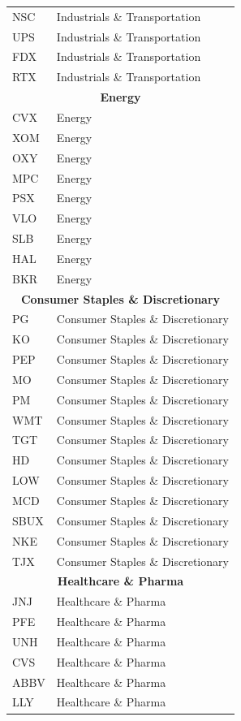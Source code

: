 \begin{longtable}{ll}
NSC & Industrials \& Transportation \\
UPS & Industrials \& Transportation \\
FDX & Industrials \& Transportation \\
RTX & Industrials \& Transportation \\
\multicolumn{2}{c}{\textbf{Energy}} \\
CVX & Energy \\
XOM & Energy \\
OXY & Energy \\
MPC & Energy \\
PSX & Energy \\
VLO & Energy \\
SLB & Energy \\
HAL & Energy \\
BKR & Energy \\
\multicolumn{2}{c}{\textbf{Consumer Staples \& Discretionary}} \\
PG   & Consumer Staples \& Discretionary \\
KO   & Consumer Staples \& Discretionary \\
PEP  & Consumer Staples \& Discretionary \\
MO   & Consumer Staples \& Discretionary \\
PM   & Consumer Staples \& Discretionary \\
WMT  & Consumer Staples \& Discretionary \\
TGT  & Consumer Staples \& Discretionary \\
HD   & Consumer Staples \& Discretionary \\
LOW  & Consumer Staples \& Discretionary \\
MCD  & Consumer Staples \& Discretionary \\
SBUX & Consumer Staples \& Discretionary \\
NKE  & Consumer Staples \& Discretionary \\
TJX  & Consumer Staples \& Discretionary \\
\multicolumn{2}{c}{\textbf{Healthcare \& Pharma}} \\
JNJ  & Healthcare \& Pharma \\
PFE  & Healthcare \& Pharma \\
UNH  & Healthcare \& Pharma \\
CVS  & Healthcare \& Pharma \\
ABBV & Healthcare \& Pharma \\
LLY  & Healthcare \& Pharma \\

\end{longtable}
